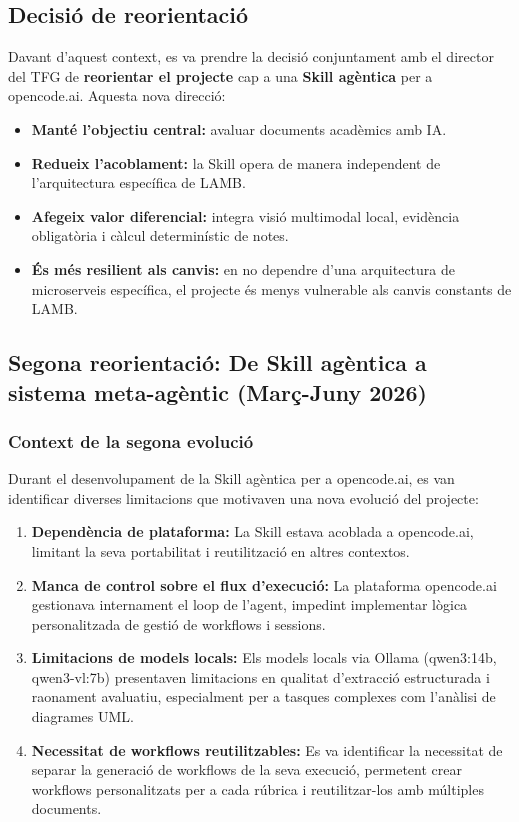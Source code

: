 \documentclass[12pt,a4paper,twoside]{report}
\begin{document}
\subsection{Decisi\'o de reorientaci\'o}

Davant d'aquest context, es va prendre la decisi\'o conjuntament amb el director del TFG de \textbf{reorientar el projecte} cap a una \textbf{Skill ag\`entica} per a opencode.ai. Aquesta nova direcci\'o:

\begin{itemize}
    \item \textbf{Mant\'e l'objectiu central:} avaluar documents acad\`emics amb IA.
    \item \textbf{Redueix l'acoblament:} la Skill opera de manera independent de l'arquitectura espec\'ifica de LAMB.
    \item \textbf{Afegeix valor diferencial:} integra visi\'o multimodal local, evid\`encia obligat\`oria i c\`alcul determin\'istic de notes.
    \item \textbf{\'Es m\'es resilient als canvis:} en no dependre d'una arquitectura de microserveis espec\'ifica, el projecte \'es menys vulnerable als canvis constants de LAMB.
\end{itemize}

\subsection{Segona reorientaci\'o: De Skill ag\`entica a sistema meta-ag\`entic (Mar\c{c}-Juny 2026)}

\subsubsection{Context de la segona evoluci\'o}

Durant el desenvolupament de la Skill ag\`entica per a opencode.ai, es van identificar diverses limitacions que motivaven una nova evoluci\'o del projecte:

\begin{enumerate}
    \item \textbf{Depend\`encia de plataforma:} La Skill estava acoblada a opencode.ai, limitant la seva portabilitat i reutilitzaci\'o en altres contextos.
    \item \textbf{Manca de control sobre el flux d'execuci\'o:} La plataforma opencode.ai gestionava internament el loop de l'agent, impedint implementar l\`ogica personalitzada de gesti\'o de workflows i sessions.
    \item \textbf{Limitacions de models locals:} Els models locals via Ollama (qwen3:14b, qwen3-vl:7b) presentaven limitacions en qualitat d'extracci\'o estructurada i raonament avaluatiu, especialment per a tasques complexes com l'an\`alisi de diagrames UML.
    \item \textbf{Necessitat de workflows reutilitzables:} Es va identificar la necessitat de separar la generaci\'o de workflows de la seva execuci\'o, permetent crear workflows personalitzats per a cada r\'ubrica i reutilitzar-los amb m\'ultiples documents.
\end{enumerate}
\end{document}
